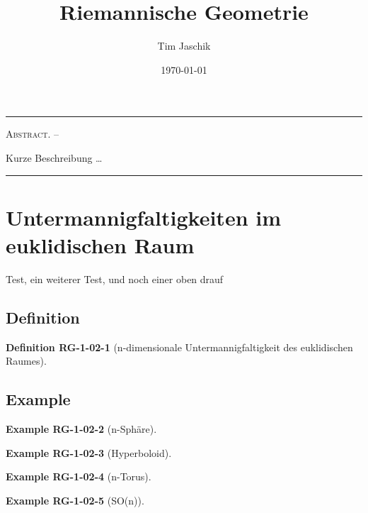\documentclass[10pt, letterpaper]{article}
\title{Riemannische Geometrie}
\author{Tim Jaschik}
\date{\today}
\renewenvironment{abstract}
  {
    \begin{adjustwidth}{1.5cm}{1.5cm}
    \small
    \textsc{Abstract. –}%
  }
  {
    \end{adjustwidth}
  }
\newcommand{\CustomHeading}[3]{%
  \par\medskip\noindent%
  \textbf{#1 #2} \textnormal{(#3)}.\enskip%
}
\newenvironment{DEF}[2]{\CustomHeading{Definition}{#1}{#2}}{}
\newenvironment{EXA}[2]{\CustomHeading{Example}{#1}{#2}}{}
\begin{document}
\maketitle
\rule{\textwidth}{0.5pt}
\begin{abstract}
Kurze Beschreibung …
\end{abstract}
\rule{\textwidth}{0.5pt}
\vspace{0.5cm}

\tableofcontents

\pagebreak


\section{Untermannigfaltigkeiten im euklidischen Raum}

Test, ein weiterer Test, und noch einer oben drauf



\subsection{Definition}

\begin{DEF}{RG-1-02-1}{n-dimensionale Untermannigfaltigkeit des euklidischen Raumes}

\end{DEF}




\subsection{Example}

\begin{EXA}{RG-1-02-2}{n-Sphäre}

\end{EXA}

\begin{EXA}{RG-1-02-3}{Hyperboloid}

\end{EXA}

\begin{EXA}{RG-1-02-4}{n-Torus}

\end{EXA}

\begin{EXA}{RG-1-02-5}{SO(n)}

\end{EXA}
\end{document}
